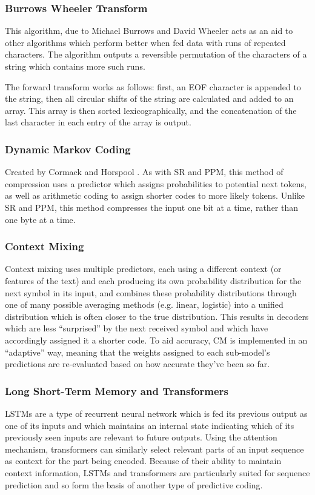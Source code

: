 \subsubsection{Burrows Wheeler Transform}
This algorithm, due to Michael Burrows and David Wheeler \autocite{Burrows1994} acts as an aid to other algorithms which perform better when fed data with runs of repeated characters. The algorithm outputs a reversible permutation of the characters of a string which contains more such runs.

The forward transform works as follows: first, an EOF character is appended to the string, then all circular shifts of the string are calculated and added to an array. This array is then sorted lexicographically, and the concatenation of the last character in each entry of the array is output.

\subsubsection{Dynamic Markov Coding}
Created by Cormack and Horspool \autocite{Cormack1987}. As with SR and PPM, this method of compression uses a predictor which assigns probabilities to potential next tokens, as well as arithmetic coding to assign shorter codes to more likely tokens. Unlike SR and PPM, this method compresses the input one bit at a time, rather than one byte at a time.

\subsubsection{Context Mixing}
Context mixing uses multiple predictors, each using a different context (or features of the text) and each producing its own probability distribution for the next symbol in its input, and combines these probability distributions through one of many possible averaging methods (e.g. linear, logistic) into a unified distribution which is often closer to the true distribution. This results in decoders which are less “surprised” by the next received symbol and which have accordingly assigned it a shorter code. To aid accuracy, CM is implemented in an “adaptive” way, meaning that the weights assigned to each sub-model’s predictions are re-evaluated based on how accurate they’ve been so far. \autocite{Mahoney2005}

\subsubsection{Long Short-Term Memory and Transformers}
LSTMs are a type of recurrent neural network which is fed its previous output as one of its inputs and which maintains an internal state indicating which of its previously seen inputs are relevant to future outputs. Using the attention mechanism, transformers can similarly select relevant parts of an input sequence as context for the part being encoded. Because of their ability to maintain context information, LSTMs and transformers are particularly suited for sequence prediction and so form the basis of another type of predictive coding.